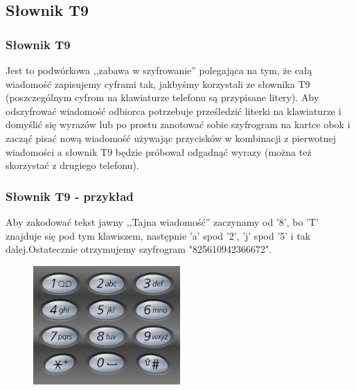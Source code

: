\documentclass[xcolor=table]{beamer}
\begin{document}
\subsection{Słownik T9}
\begin{frame}
  \frametitle{Słownik T9}
  Jest to podwórkowa ,,zabawa w szyfrowanie'' polegająca na tym, że całą wiadomość zapisujemy cyframi tak, jakbyśmy korzystali ze słownika T9 (poszczególnym cyfrom na klawiaturze telefonu są przypisane litery). \newline \newline Aby odszyfrować wiadomość odbiorca potrzebuje prześledzić literki na klawiaturze i domyślić się wyrazów lub po prostu zanotować sobie szyfrogram na kartce obok i zacząć pisać nową wiadomość używając przycisków w kombinacji z pierwotnej wiadomości a słownik T9 będzie próbował odgadnąć wyrazy (można też skorzystać z drugiego telefonu).
\end{frame}

\begin{frame}
  \frametitle{Słownik T9 - przykład}
Aby zakodować tekst jawny ,,Tajna wiadomość'' zaczynamy od '8', bo 'T' znajduje się pod tym klawiszem, następnie 'a' spod '2', 'j' spod '5'  i tak dalej.\newline \newline Ostatecznie otrzymujemy szyfrogram "825610942366672". 
 \begin{center}
    \begin{figure}
      \includegraphics[width=0.5\textwidth]{phone_keys}
    \end{figure}
  \end{center}
\end{frame}
\end{document}
